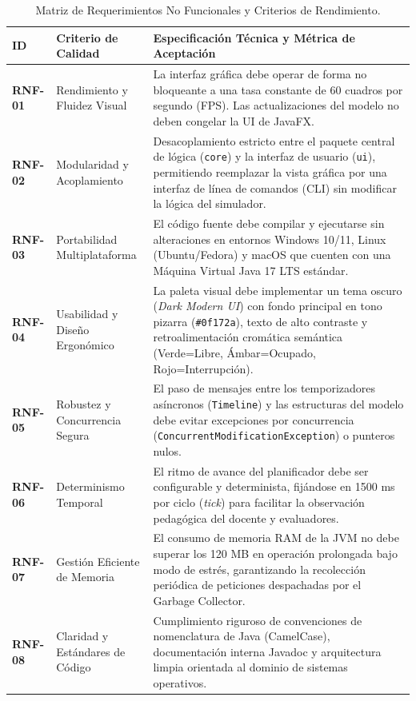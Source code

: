 \documentclass[11pt,letterpaper]{article}
\begin{document}
\begin{table}[htbp]
\centering
\small
\renewcommand{\arraystretch}{1.3}
\begin{tabularx}{\textwidth}{|l|p{4cm}|L|}
\hline
\textbf{ID} & \textbf{Criterio de Calidad} & \textbf{Especificación Técnica y Métrica de Aceptación} \\ \hline
\textbf{RNF-01} & Rendimiento y Fluidez Visual & La interfaz gráfica debe operar de forma no bloqueante a una tasa constante de 60 cuadros por segundo (FPS). Las actualizaciones del modelo no deben congelar la UI de JavaFX. \\ \hline
\textbf{RNF-02} & Modularidad y Acoplamiento & Desacoplamiento estricto entre el paquete central de lógica (\texttt{core}) y la interfaz de usuario (\texttt{ui}), permitiendo reemplazar la vista gráfica por una interfaz de línea de comandos (CLI) sin modificar la lógica del simulador. \\ \hline
\textbf{RNF-03} & Portabilidad Multiplataforma & El código fuente debe compilar y ejecutarse sin alteraciones en entornos Windows 10/11, Linux (Ubuntu/Fedora) y macOS que cuenten con una Máquina Virtual Java 17 LTS estándar. \\ \hline
\textbf{RNF-04} & Usabilidad y Diseño Ergonómico & La paleta visual debe implementar un tema oscuro (\textit{Dark Modern UI}) con fondo principal en tono pizarra (\texttt{\#0f172a}), texto de alto contraste y retroalimentación cromática semántica (Verde=Libre, Ámbar=Ocupado, Rojo=Interrupción). \\ \hline
\textbf{RNF-05} & Robustez y Concurrencia Segura & El paso de mensajes entre los temporizadores asíncronos (\texttt{Timeline}) y las estructuras del modelo debe evitar excepciones por concurrencia (\texttt{ConcurrentModificationException}) o punteros nulos. \\ \hline
\textbf{RNF-06} & Determinismo Temporal & El ritmo de avance del planificador debe ser configurable y determinista, fijándose en 1500 ms por ciclo (\textit{tick}) para facilitar la observación pedagógica del docente y evaluadores. \\ \hline
\textbf{RNF-07} & Gestión Eficiente de Memoria & El consumo de memoria RAM de la JVM no debe superar los 120 MB en operación prolongada bajo modo de estrés, garantizando la recolección periódica de peticiones despachadas por el Garbage Collector. \\ \hline
\textbf{RNF-08} & Claridad y Estándares de Código & Cumplimiento riguroso de convenciones de nomenclatura de Java (CamelCase), documentación interna Javadoc y arquitectura limpia orientada al dominio de sistemas operativos. \\ \hline
\end{tabularx}
\caption{Matriz de Requerimientos No Funcionales y Criterios de Rendimiento.}
\label{tab:rnf}
\end{table}
\end{document}
